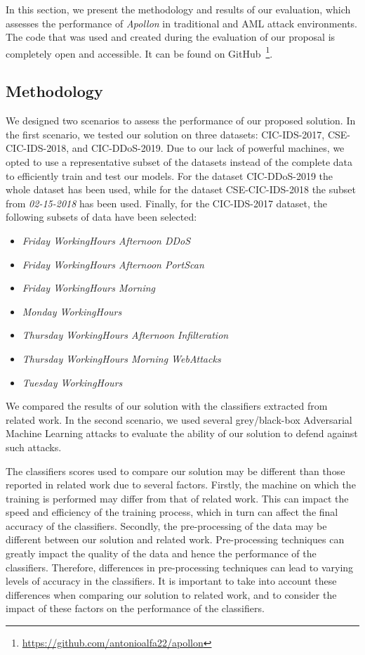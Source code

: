 In this section, we present the methodology and results of our evaluation, which assesses the performance of \textit{Apollon} in
traditional and AML attack environments.
The code that was used and created during the evaluation of our proposal is completely open and accessible.
It can be found on GitHub~\footnote{\url{https://github.com/antonioalfa22/apollon}}.


\subsection{Methodology}\label{subsec:methodology}
We designed two scenarios to assess the performance of our proposed solution.
In the first scenario, we tested our solution on three datasets: CIC-IDS-2017, CSE-CIC-IDS-2018, and CIC-DDoS-2019.
Due to our lack of powerful machines, we opted to use a representative subset of the datasets instead of the complete
data to efficiently train and test our models.
For the dataset CIC-DDoS-2019 the whole dataset has been used, while for the dataset CSE-CIC-IDS-2018 the subset
from \textit{02-15-2018} has been used.
Finally, for the CIC-IDS-2017 dataset, the following subsets of data have been selected:

\begin{itemize}
    \item \textit{Friday WorkingHours Afternoon DDoS}
    \item \textit{Friday WorkingHours Afternoon PortScan}
    \item \textit{Friday WorkingHours Morning}
    \item \textit{Monday WorkingHours}
    \item \textit{Thursday WorkingHours Afternoon Infilteration}
    \item \textit{Thursday WorkingHours Morning WebAttacks}
    \item \textit{Tuesday WorkingHours}
\end{itemize}


We compared the results of our solution with the classifiers extracted from related work.
In the second scenario, we used several grey/black-box Adversarial Machine Learning attacks to evaluate the ability of
our solution to defend against such attacks.

The classifiers scores used to compare our solution may be different than those reported in related work due to several
factors.
Firstly, the machine on which the training is performed may differ from that of related work.
This can impact the speed and efficiency of the training process, which in turn can affect the final accuracy of the
classifiers.
Secondly, the pre-processing of the data may be different between our solution and related work.
Pre-processing techniques can greatly impact the quality of the data and hence the performance of the classifiers.
Therefore, differences in pre-processing techniques can lead to varying levels of accuracy in the classifiers.
It is important to take into account these differences when comparing our solution to related work, and to consider
the impact of these factors on the performance of the classifiers.

